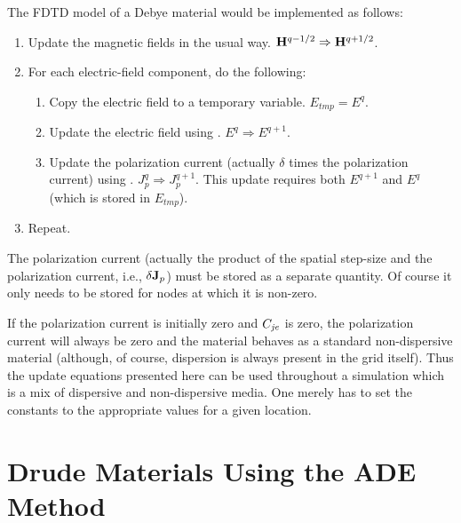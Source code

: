 The FDTD model of a Debye material would be implemented as follows:
\begin{enumerate}
\item Update the magnetic fields in the usual way.  
      $\mathbf{H}^{q-1/2}\Rightarrow \mathbf{H}^{q+1/2}$.
\item For each electric-field component, do the following:
\begin{enumerate}
\item Copy the electric field to a temporary variable.
      $E_{\mathit{tmp}}=E^q$.
\item Update the electric field using .
      $E^{q}\Rightarrow E^{q+1}$.
\item Update the polarization current (actually $\delta$ times the
      polarization current) using
      . $J_p^q\Rightarrow J_p^{q+1}$.
      This update requires both $E^{q+1}$ and $E^q$ (which is stored
      in $E_{\mathit{tmp}}$).
\end{enumerate}
\item Repeat.
\end{enumerate}
The polarization current (actually the product of the spatial
step-size and the polarization current, i.e., $\delta\mathbf{J}_p$) must be
stored as a separate quantity.  Of course it only needs to be stored
for nodes at which it is non-zero.

If the polarization current is initially zero and $C_{\mathit{je}}$ is zero, the
polarization current will always be zero and the material behaves as a
standard non-dispersive material (although, of course, dispersion is
always present in the grid itself).  Thus the update equations
presented here can be used throughout a simulation which is a mix of
dispersive and non-dispersive media.  One merely has to set the
constants to the appropriate values for a given location.

\section{Drude Materials Using the ADE Method}

